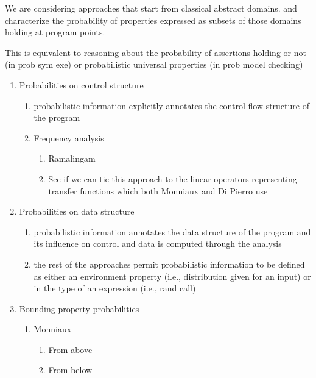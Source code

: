 We are considering approaches that start from classical abstract domains.
and characterize the probability of properties expressed as subsets
of those domains holding at program points.

This is equivalent to reasoning about the probability of assertions
holding or not (in prob sym exe) or probabilistic universal properties
(in prob model checking) 

\begin{enumerate}

 \item Probabilities on control structure
   \begin{enumerate}
    \item probabilistic information explicitly annotates the control flow
    structure of the program
    \item Frequency analysis
      \begin{enumerate}
       \item Ramalingam
       \item See if we can tie this approach to the linear
  	  operators representing transfer functions
  	  which both Monniaux and Di Pierro use
      \end{enumerate}
   \end{enumerate}

 \item Probabilities on data structure
   \begin{enumerate}
    \item probabilistic information annotates the data structure of the
    program and its influence on control and data is computed through
    the analysis
    \item the rest of the approaches permit probabilistic information to
    be defined as either an environment property (i.e., distribution
    given for an input) or in the type of an expression (i.e., rand call)
   \end{enumerate}

 \item Bounding property probabilities
   \begin{enumerate}
    \item Monniaux
      \begin{enumerate}
       \item From above
       \item From below
      \end{enumerate}
   \end{enumerate}


\end{enumerate}
